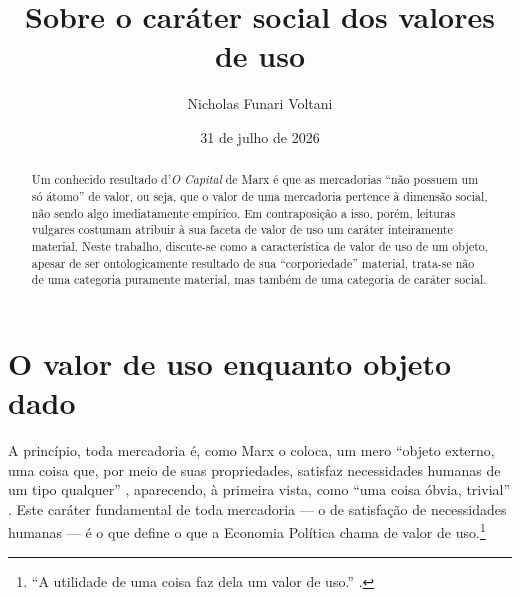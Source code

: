 \documentclass[12pt]{article}
\title{Sobre o caráter social dos valores de uso}
\author{Nicholas Funari Voltani}
\date{31 de julho de 2026}
\begin{document}
\maketitle

\begin{abstract}
    Um conhecido resultado d'\textit{O Capital} de Marx é que as mercadorias ``não possuem um só átomo'' de valor, ou seja, que o valor de uma mercadoria pertence à dimensão social, não sendo algo imediatamente empírico. Em contraposição a isso, porém, leituras vulgares costumam atribuir à sua faceta de valor de uso um caráter inteiramente material. Neste trabalho, discute-se como a característica de valor de uso de um objeto, apesar de ser ontologicamente resultado de sua ``corporiedade'' material, trata-se não de uma categoria puramente material, mas também de uma categoria de caráter social.
\end{abstract}


\section{O valor de uso enquanto objeto dado}
A princípio, toda mercadoria é, como Marx o coloca, um mero ``objeto externo, uma coisa que, por meio de suas propriedades, satisfaz necessidades humanas de um tipo qualquer'' \parencite[p. 113]{Marx2017}, aparecendo, à primeira vista, como ``uma coisa óbvia, trivial'' \parencite[p. 146]{Marx2017}. Este caráter fundamental de toda mercadoria — o de satisfação de necessidades humanas — é o que define o que a Economia Política chama de valor de uso.\footnote{``A utilidade de uma coisa faz dela um valor de uso.'' \parencite[p. 114]{Marx2017}.} 
\end{document}
